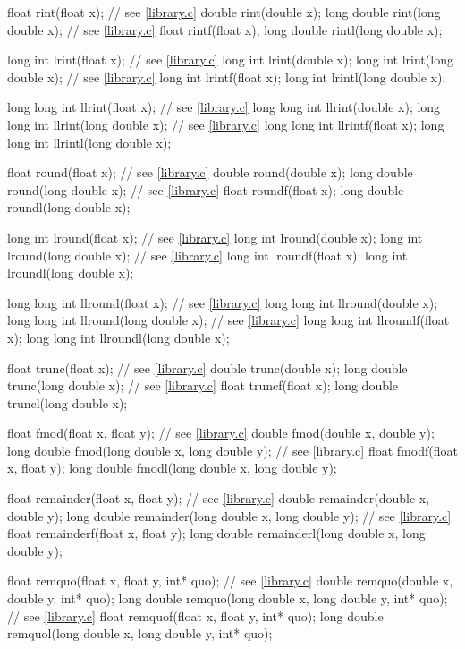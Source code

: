 \begin{codeblock}
{  float rint(float x);  // see \ref{library.c}
  double rint(double x);
  long double rint(long double x);  // see \ref{library.c}
  float rintf(float x);
  long double rintl(long double x);

  long int lrint(float x);  // see \ref{library.c}
  long int lrint(double x);
  long int lrint(long double x);  // see \ref{library.c}
  long int lrintf(float x);
  long int lrintl(long double x);

  long long int llrint(float x);  // see \ref{library.c}
  long long int llrint(double x);
  long long int llrint(long double x);  // see \ref{library.c}
  long long int llrintf(float x);
  long long int llrintl(long double x);

  float round(float x);  // see \ref{library.c}
  double round(double x);
  long double round(long double x);  // see \ref{library.c}
  float roundf(float x);
  long double roundl(long double x);

  long int lround(float x);  // see \ref{library.c}
  long int lround(double x);
  long int lround(long double x);  // see \ref{library.c}
  long int lroundf(float x);
  long int lroundl(long double x);

  long long int llround(float x);  // see \ref{library.c}
  long long int llround(double x);
  long long int llround(long double x);  // see \ref{library.c}
  long long int llroundf(float x);
  long long int llroundl(long double x);

  float trunc(float x);  // see \ref{library.c}
  double trunc(double x);
  long double trunc(long double x);  // see \ref{library.c}
  float truncf(float x);
  long double truncl(long double x);

  float fmod(float x, float y);  // see \ref{library.c}
  double fmod(double x, double y);
  long double fmod(long double x, long double y);  // see \ref{library.c}
  float fmodf(float x, float y);
  long double fmodl(long double x, long double y);

  float remainder(float x, float y);  // see \ref{library.c}
  double remainder(double x, double y);
  long double remainder(long double x, long double y);  // see \ref{library.c}
  float remainderf(float x, float y);
  long double remainderl(long double x, long double y);

  float remquo(float x, float y, int* quo);  // see \ref{library.c}
  double remquo(double x, double y, int* quo);
  long double remquo(long double x, long double y, int* quo);  // see \ref{library.c}
  float remquof(float x, float y, int* quo);
  long double remquol(long double x, long double y, int* quo);

}
\end{codeblock}
